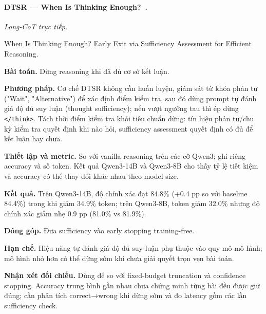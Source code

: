 \begin{samepage}
\paragraph{DTSR — When Is Thinking Enough?~\cite{rra2_dtsr}.}
\emph{Long-CoT trực tiếp.}\par
{\raggedright\noindent\small When Is Thinking Enough? Early Exit via Sufficiency Assessment for Efficient Reasoning.\par}
\noindent\textbf{Bài toán.} Dừng reasoning khi đã đủ cơ sở kết luận.\par
\end{samepage}
\noindent\textbf{Phương pháp.} Cơ chế DTSR không cần huấn luyện, giám sát từ khóa phản tư ("Wait", "Alternative") để xác định điểm kiểm tra, sau đó dùng prompt tự đánh giá độ đủ suy luận (thought sufficiency); nếu vượt ngưỡng tau thì ép dừng \texttt{</think>}. Tách thời điểm kiểm tra khỏi tiêu chuẩn dừng: tín hiệu phản tư/chu kỳ kiểm tra quyết định khi nào hỏi, sufficiency assessment quyết định có đủ để kết luận hay chưa.\par
\noindent\textbf{Thiết lập và metric.} So với vanilla reasoning trên các cỡ Qwen3; ghi riêng accuracy và số token. Kết quả Qwen3-14B và Qwen3-8B cho thấy tỷ lệ tiết kiệm và accuracy có thể thay đổi khác nhau theo model size.\par
\noindent\textbf{Kết quả.} Trên Qwen3-14B, độ chính xác đạt 84.8\% (+0.4 pp so với baseline 84.4\%) trong khi giảm 34.9\% token; trên Qwen3-8B, token giảm 32.0\% nhưng độ chính xác giảm nhẹ 0.9 pp (81.0\% vs 81.9\%).\par
\noindent\textbf{Đóng góp.} Đưa sufficiency vào early stopping training-free.\par
\noindent\textbf{Hạn chế.} Hiệu năng tự đánh giá độ đủ suy luận phụ thuộc vào quy mô mô hình; mô hình nhỏ hơn có thể dừng sớm khi chưa giải quyết trọn vẹn bài toán.\par
\begin{samepage}
\noindent\textbf{Nhận xét đối chiếu.} Dùng để so với fixed-budget truncation và confidence stopping. Accuracy trung bình gần nhau chưa chứng minh từng bài đều được giữ đúng; cần phân tích correct→wrong khi dừng sớm và đo latency gồm các lần sufficiency check.\par
{}
\end{samepage}


